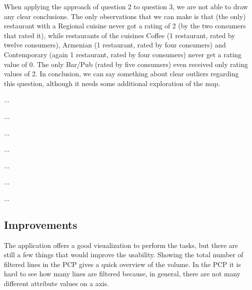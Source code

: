 When applying the approach of question 2 to question 3, we are not able to draw any clear conclusions. The only observations that we can make is that (the only) restaurant with a Regional cuisine never got a rating of 2 (by the two consumers that rated it), while restaurants of the cuisines Coffee (1 restaurant, rated by twelve consumers), Armenian (1 restaurant, rated by four consumers) and Contemporary (again 1 restaurant, rated by four consumers) never get a rating value of 0. The only Bar/Pub (rated by five consumers) even received only rating values of 2. In conclusion, we can say something about clear outliers regarding this question, although it needs some additional exploration of the map.

...

...

...

...

...

...

...


\subsection{Improvements}\label{sec:improvements}

The application offers a good visualization to perform the tasks, but there are still a few things that would improve the usability.
Showing the total number of filtered lines in the PCP gives a quick overview of the volume.
In the PCP it is hard to see how many lines are filtered because, in general, there are not many different attribute values on a axis.


